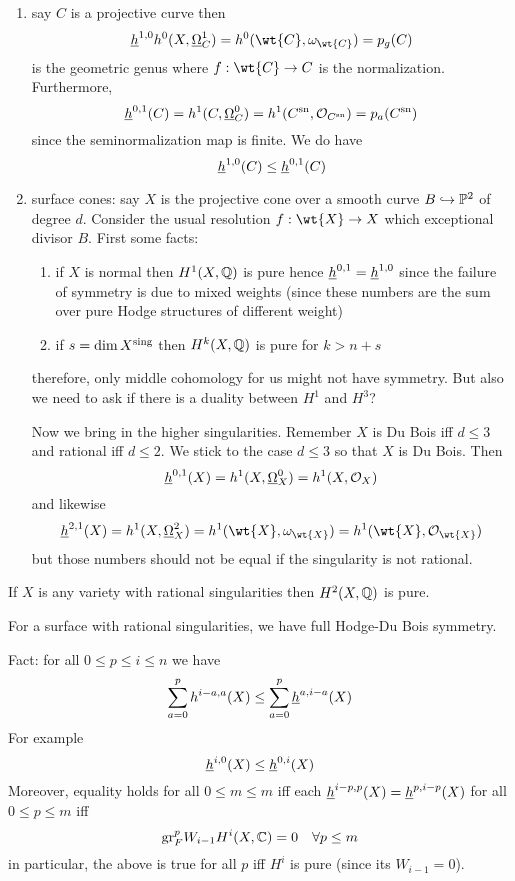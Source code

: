 \documentclass[12pt]{article}
\renewcommand{\gr}{\mathrm{gr}}
\begin{document}
\begin{example}
\begin{enumerate}
\item say $C$ is a projective curve then 
\[ \ulh^{1,0} h^0(X, \ulO_C^1) = h^0(\wt{C}, \omega_{\wt{C}}) = p_g(C) \]
is the geometric genus where $f : \wt{C} \to C$ is the normalization. Furthermore,
\[ \underline{h}^{0,1}(C) = h^1(C, \underline{\Omega}_C^0) = h^1(C^{\mathrm{sn}}, \mathcal{O}_{C^{\mathrm{sn}}}) = p_a(C^{\mathrm{sn}}) \]
since the seminormalization map is finite. We do have
\[ \underline{h}^{1,0}(C) \le \underline{h}^{0,1}(C) \]

\item surface cones: say $X$ is the projective cone over a smooth curve $B \hookrightarrow \mathbb{P}^2$ of degree $d$. Consider the usual resolution $f : \wt{X} \to X$ which exceptional divisor $B$. First some facts:
\begin{enumerate}
\item if $X$ is normal then $H^1(X, \mathbb{Q})$ is pure hence $\underline{h}^{0,1} = \underline{h}^{1,0}$ since the failure of symmetry is due to mixed weights (since these numbers are the sum over pure Hodge structures of different weight)
\item if $s = \dim{X^{\mathrm{sing}}}$ then $H^k(X, \mathbb{Q})$ is pure for $k > n + s$
\end{enumerate}
therefore, only middle cohomology for us might not have symmetry. But also we need to ask if there is a duality between $H^1$ and $H^3$?
\par 
Now we bring in the higher singularities. Remember $X$ is Du Bois iff $d \le 3$ and rational iff $d \le 2$. We stick to the case $d \le 3$ so that $X$ is Du Bois. Then
\[ \underline{h}^{0,1}(X) = h^1(X, \underline{\Omega}_X^0) = h^1(X, \mathcal{O}_{X}) \]
and likewise
\[ \ulh^{2,1}(X) = h^1(X, \ulO_X^2) = h^1(\wt{X}, \omega_{\wt{X}}) = h^1(\wt{X}, \struct{\wt{X}}) \]
but those numbers should not be equal if the singularity is not rational. 
\end{enumerate}
\end{example}

\begin{prop}
If $X$ is any variety with rational singularities then $H^2(X, \mathbb{Q})$ is pure.
\end{prop}

\begin{cor}
For a surface with rational singularities, we have full Hodge-Du Bois symmetry. 
\end{cor}


Fact: for all $0 \le p \le i \le n$ we have
\[ \sum_{a = 0}^p h^{i-a,a}(X) \le \sum_{a = 0}^p \underline{h}^{a,i-a}(X) \] 
For example
\[ \underline{h}^{i,0}(X) \le \underline{h}^{0,i}(X) \]
Moreover, equality holds for all $0 \le m \le m$ iff each $\underline{h}^{i-p,p}(X) = \underline{h}^{p,i-p}(X)$ for all $0 \le p \le m$ iff 
\[ \gr^p_F W_{i-1} H^i(X, \CC) = 0 \quad \forall p \le m \]
in particular, the above is true for all $p$ iff $H^i$ is pure (since its $W_{i - 1} = 0$). 
\end{document}
